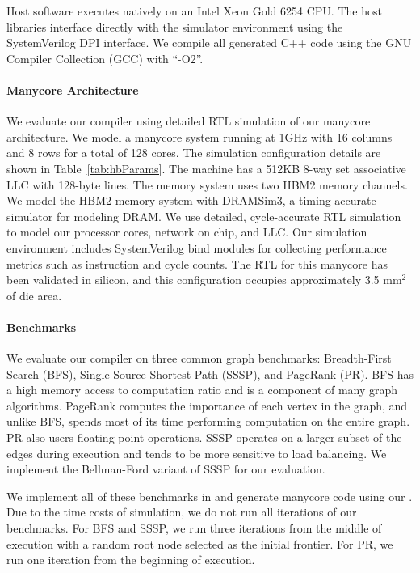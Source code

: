 Host software executes natively on an Intel Xeon Gold 6254 CPU.
The host libraries interface directly with the simulator environment using the SystemVerilog DPI interface.
We compile all generated C++ code using the GNU Compiler Collection (GCC) with ``-O2''.

\paragraph{Manycore Architecture}
\tabHBParams
We evaluate our compiler using detailed RTL simulation of our manycore architecture.
We model a manycore system running at 1GHz with 16 columns and 8 rows for a total of 128 cores.
The simulation configuration details are shown in Table~\ref{tab:hbParams}.
The machine has a 512KB 8-way set associative LLC with 128-byte lines.
The memory system uses two HBM2 memory channels.
We model the HBM2 memory system with DRAMSim3\cite{li2019dramsim3},  a timing accurate simulator for modeling DRAM.
We use detailed, cycle-accurate RTL simulation to model our processor cores, network on chip, and LLC.
Our simulation environment includes SystemVerilog bind modules for collecting performance metrics such as instruction and cycle counts.
The RTL for this manycore has been validated in silicon, and this configuration occupies approximately 3.5 mm$^2$ of die area. 


\paragraph{Benchmarks} We evaluate our compiler on three common graph benchmarks: Breadth-First Search (BFS), Single Source Shortest Path (SSSP), and PageRank (PR). 
BFS has a high memory access to computation ratio and is a component of many graph algorithms.
PageRank computes the importance of each vertex in the graph, and unlike BFS, spends most of its time performing computation on the entire graph.
PR also users floating point operations.
SSSP operates on a larger subset of the edges during execution and tends to be more sensitive to load balancing.
We implement the Bellman-Ford variant of SSSP for our evaluation.

We implement all of these benchmarks in \graphit and generate manycore code using our \hb \graphvm.
Due to the time costs of simulation, we do not run all iterations of our benchmarks. 
For BFS and SSSP, we run three iterations from the middle of execution with a random root node selected as the initial frontier.
For PR, we run one iteration from the beginning of execution.



